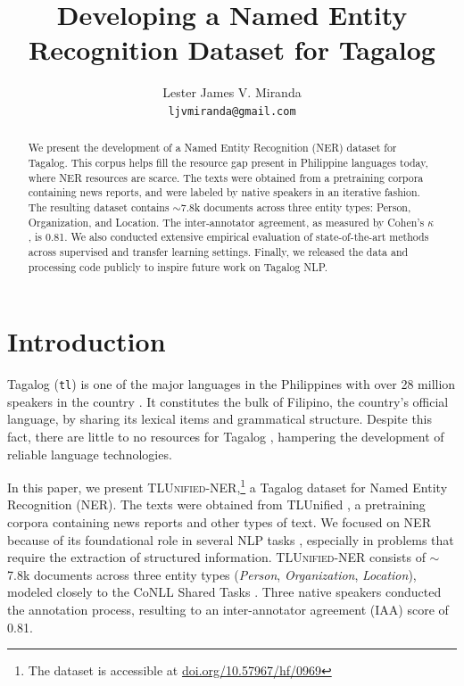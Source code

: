 \documentclass[11pt]{article}
\title{Developing a Named Entity Recognition Dataset for Tagalog}
\author{Lester James V. Miranda \\
  \texttt{ljvmiranda@gmail.com} \\}
\begin{document}
\newcommand{\tlunified}{\textsc{TLUnified-NER}}

\maketitle
\begin{abstract}
  We present the development of a Named Entity Recognition (NER) dataset for Tagalog.
  This corpus helps fill the resource gap present in Philippine languages today, where NER resources are scarce.
  The texts were obtained from a pretraining corpora containing news reports, and were labeled by native speakers in an iterative fashion.
  The resulting dataset contains $\sim$7.8k documents across three entity types: Person, Organization, and Location.
  The inter-annotator agreement, as measured by Cohen's $\kappa$, is 0.81.
  We also conducted extensive empirical evaluation of state-of-the-art methods across supervised and transfer learning settings.
  Finally, we released the data and processing code publicly to inspire future work on Tagalog NLP.
\end{abstract}

\section{Introduction}

Tagalog (\texttt{tl}) is one of the major languages in the Philippines with over 28 million speakers in the country \cite{Lewis2009EthnologueL}. 
It constitutes the bulk of Filipino, the country's official language, by sharing its lexical items and grammatical structure.
Despite this fact, there are little to no resources for Tagalog \cite{Cruz2021ImprovingLL}, hampering the development of reliable language technologies.

In this paper, we present \tlunified{},\footnote[1]{The dataset is accessible at \url{doi.org/10.57967/hf/0969}} a Tagalog dataset for Named Entity Recognition (NER).
The texts were obtained from TLUnified \cite{Cruz2021ImprovingLL}, a pretraining corpora containing news reports and other types of text.
We focused on NER because of its foundational role in several NLP tasks \citep{Sang2003IntroductionTT,Lample2016NeuralAF}, especially in problems that require the extraction of structured information. 
\tlunified{} consists of $\sim$7.8k documents across three entity types (\textit{Person}, \textit{Organization}, \textit{Location}), modeled closely to the CoNLL Shared Tasks \cite{Sang2002IntroductionTT,Sang2003IntroductionTT}.
Three native speakers conducted the annotation process, resulting to an inter-annotator agreement (IAA) score of 0.81.
\end{document}
